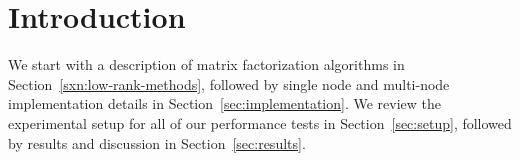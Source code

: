 \section{Introduction}
\label{sec:intro}



We start with a description of matrix factorization algorithms in Section~\ref{sxn:low-rank-methods}, followed by single node and multi-node implementation details in Section~\ref{sec:implementation}. We review the experimental setup for all of our performance tests in Section~\ref{sec:setup}, followed by results and discussion in Section~\ref{sec:results}.

